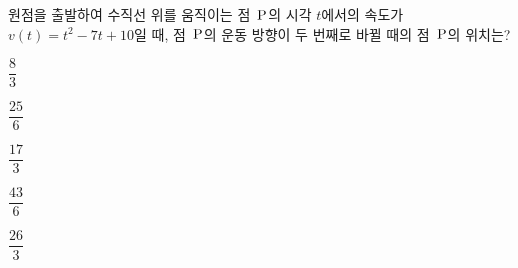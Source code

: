 원점을 출발하여 수직선 위를 움직이는 점~$\mathrm{P}$의 시각 $t$에서의 속도가 $v(t)=t^2-7t+10$일 때, 점~$\mathrm{P}$의 운동 방향이 두 번째로 바뀔 때의 점~$\mathrm{P}$의 위치는?
\begin{choices32}{\rule[-3ex]{0pt}{8ex}$\dfrac{8}{3}$}{\rule[-3ex]{0pt}{8ex}$\dfrac{25}{6}$}{\rule[-3ex]{0pt}{8ex}$\dfrac{17}{3}$}{\rule[-3ex]{0pt}{8ex}$\dfrac{43}{6}$}{\rule[-3ex]{0pt}{8ex}$\dfrac{26}{3}$}\end{choices32}
